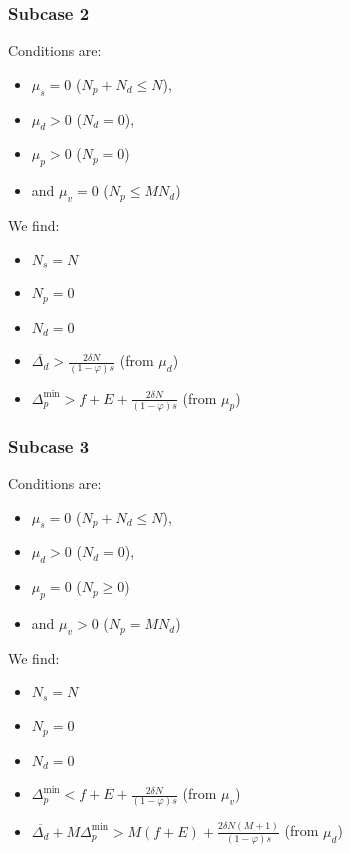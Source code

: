 \documentclass[english, a4paper]{article}
\theoremstyle{plain}
\theoremstyle{definition}
\theoremstyle{remark}
\begin{document}
\subsubsection{Subcase 2}

Conditions are:
\begin{itemize}
    \item $\mu_s = 0$ ($N_p + N_d \leq N$),
    \item $\mu_d > 0$ ($N_d = 0$),
    \item $\mu_p > 0$ ($N_p = 0$)
    \item and $\mu_v = 0$ ($N_p \leq MN_d$)
\end{itemize}

We find:
\begin{itemize}
    \item $N_s = N$
    \item $N_p = 0$
    \item $N_d = 0$
    \item $\overline{\Delta_d} > \frac{2\delta N }{(1 - \varphi)s}$ (from $\mu_d$)
    \item $\Delta_p^{\text{min}} > f+ E + \frac{2\delta N}{(1 - \varphi) s}$ (from $\mu_p$)
\end{itemize}

\subsubsection{Subcase 3}

Conditions are:
\begin{itemize}
    \item $\mu_s = 0$ ($N_p + N_d \leq N$),
    \item $\mu_d > 0$ ($N_d = 0$),
    \item $\mu_p = 0$ ($N_p \geq 0$)
    \item and $\mu_v > 0$ ($N_p = MN_d$)
\end{itemize}

We find:
\begin{itemize}
    \item $N_s = N$
    \item $N_p = 0$
    \item $N_d = 0$
    \item $\Delta_p^{\text{min}} < f+ E + \frac{2\delta N}{(1 - \varphi) s}$ (from $\mu_v$)
    \item $\overline{\Delta_d} + M \Delta_p^{\text{min}} > M(f+ E) + \frac{2\delta N (M+1)}{(1 - \varphi) s}$ (from $\mu_d$)
\end{itemize}
\end{document}

